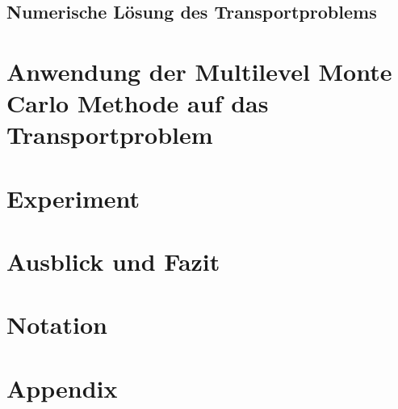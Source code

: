 \documentclass[12pt,a4paper]{scrartcl}
\theoremstyle{definition}
\numberwithin{equation}{section}
\begin{document}
\subsection{Numerische Lösung des Transportproblems}


\newpage  %
\section{Anwendung der Multilevel Monte Carlo Methode auf das Transportproblem}
\label{MLMCTP}

\newpage  %
\section{Experiment}


\newpage  %
\section{Ausblick und Fazit}
\newpage  %
\section{Notation}

\newpage  %
\section{Appendix}



  \newpage

  
  
 
      

\newpage
  
\end{document}
